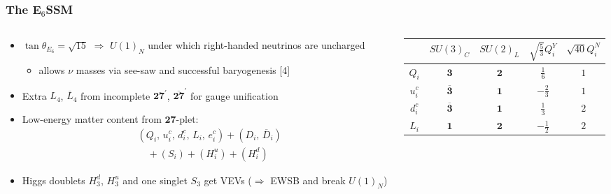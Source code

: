 \documentclass[10pt,aspectratio=169]{beamer}
\begin{document}
\begin{frame}
  \frametitle{The E$_6$SSM}
    \begin{columns}[t]
      \begin{column}{0.5\textwidth}
        \begin{itemize} \itemsep0.2em
        \item $\tan\theta_{E_6} = \sqrt{15}$ $\Rightarrow$ $U(1)_N$
          under which right-handed neutrinos are uncharged
          \begin{itemize}
            \item allows {\color{blue} $\nu$ masses via see-saw} and
              {\color{blue} successful baryogenesis} [4]
          \end{itemize}
        \item Extra $L_4$, $\overline{L}_4$ from incomplete
          $\mathbf{27}^\prime$, $\mathbf{\overline{27}}^\prime$ for gauge
          unification
        \item Low-energy matter content from $\mathbf{27}$-plet:
          \begin{align*}
            &(Q_i, \, u^c_i, \, d^c_i, \, L_i, \,
            e^c_i) + (D_i, \, \overline{D}_i)\\
            &\quad {} + (S_{i}) + (H^u_i) + (H^d_i)
          \end{align*}
        \item Higgs doublets $H^d_3$, $H^u_3$ and one singlet
          $S_3$ get VEVs ($\Rightarrow$ EWSB and break $U(1)_N$)
          \vfill
        \end{itemize}
      \end{column}
      \begin{column}{0.5\textwidth}
        \vspace{-40pt}
        \begin{table}[h]
          \centering
          \begin{tabular}{ccccc}
            \toprule
            & $SU(3)_C$ & $SU(2)_L$ & $\sqrt{\frac{5}{3}} Q_i^Y$
            & $\sqrt{40} Q_i^N$ \\
            \midrule
            $Q_i$ & $\mathbf{3}$ & $\mathbf{2}$ & $\frac{1}{6}$ & $1$ \\
            $u_i^c$ & $\mathbf{\overline{3}}$ & $\mathbf{1}$
            & $-\frac{2}{3}$ & $1$ \\
            $d_i^c$ & $\mathbf{\overline{3}}$ & $\mathbf{1}$
            & $\frac{1}{3}$ & $2$ \\
            $L_i$ & $\mathbf{1}$ & $\mathbf{2}$ & $-\frac{1}{2}$ & $2$ \\

\end{tabular}
\end{table}
\end{column}
\end{columns}
\end{frame}
\end{document}
